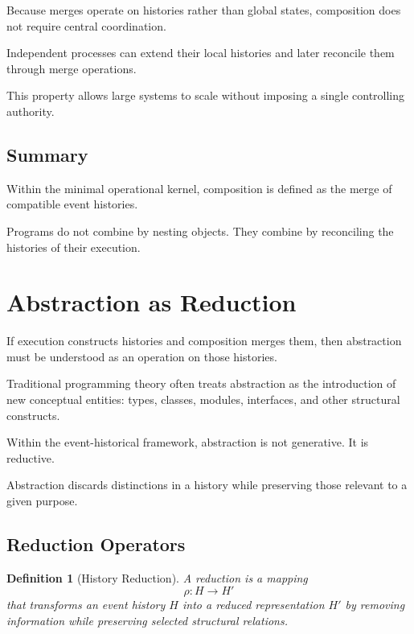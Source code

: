 \documentclass[12pt]{article}
\newtheorem{definition}{Definition}
\begin{document}
Because merges operate on histories rather than
global states, composition does not require
central coordination.

Independent processes can extend their local
histories and later reconcile them through
merge operations.

This property allows large systems to scale
without imposing a single controlling authority.

\subsection{Summary}

Within the minimal operational kernel,
composition is defined as the merge of compatible
event histories.

Programs do not combine by nesting objects.
They combine by reconciling the histories
of their execution.


\section{Abstraction as Reduction}

If execution constructs histories and composition merges them,
then abstraction must be understood as an operation on those
histories.

Traditional programming theory often treats abstraction
as the introduction of new conceptual entities:
types, classes, modules, interfaces, and other
structural constructs.

Within the event-historical framework, abstraction
is not generative. It is reductive.

Abstraction discards distinctions in a history
while preserving those relevant to a given purpose.

\subsection{Reduction Operators}

\begin{definition}[History Reduction]
A reduction is a mapping
\[
\rho : H \rightarrow H'
\]
that transforms an event history $H$ into a reduced
representation $H'$ by removing information while
preserving selected structural relations.
\end{definition}
\end{document}

